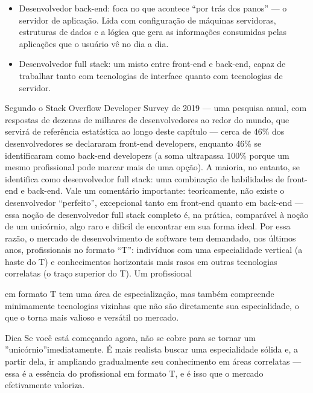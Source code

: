 \begin{itemize}
  \item Desenvolvedor back-end: foca no que acontece “por trás dos panos” — o servidor de aplicação. Lida com configuração de máquinas servidoras, estruturas de dados e a lógica que gera as informações consumidas pelas aplicações que o usuário vê no dia a dia.
\end{itemize}

\begin{itemize}
  \item Desenvolvedor full stack: um misto entre front-end e back-end, capaz de trabalhar tanto com tecnologias de interface quanto com tecnologias de servidor.
\end{itemize}

Segundo o Stack Overflow Developer Survey de 2019 — uma pesquisa anual, com respostas de dezenas de milhares de desenvolvedores ao redor do mundo, que servirá de referência estatística ao longo deste capítulo — cerca de 46\% dos desenvolvedores se declararam front-end developers, enquanto 46\% se identificaram como back-end developers (a soma ultrapassa 100\% porque um mesmo profissional pode marcar mais de uma opção). A maioria, no entanto, se identifica como desenvolvedor full stack: uma combinação de habilidades de front-end e back-end. Vale um comentário importante: teoricamente, não existe o desenvolvedor “perfeito”, excepcional tanto em front-end quanto em back-end — essa noção de desenvolvedor full stack completo é, na prática, comparável à noção de um unicórnio, algo raro e difícil de encontrar em sua forma ideal. Por essa razão, o mercado de desenvolvimento de software tem demandado, nos últimos anos, profissionais no formato “T”: indivíduos com uma especialidade vertical (a haste do T) e conhecimentos horizontais mais rasos em outras tecnologias correlatas (o traço superior do T). Um profissional

em formato T tem uma área de especialização, mas também compreende minimamente tecnologias vizinhas que não são diretamente sua especialidade, o que o torna mais valioso e versátil no mercado.

\begin{infobox}{Dica}
Se você está começando agora, não se cobre para se tornar um ”unicórnio”imediatamente. É mais realista buscar uma especialidade sólida e, a partir dela, ir ampliando gradualmente seu conhecimento em áreas correlatas — essa é a essência do profissional em formato T, e é isso que o mercado efetivamente valoriza.
\end{infobox}

